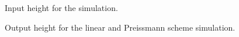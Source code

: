 \begin{figure}[H]
 \centering
 
\caption{Input height for the simulation.}
\label{fig:height_input_for_comparision}
\end{figure}

\begin{figure}[H]
 \centering
 
\caption{Output height for the linear and Preissmann scheme simulation.}
\label{fig:height_output_nonlinear_and_linear_model}
\end{figure}

